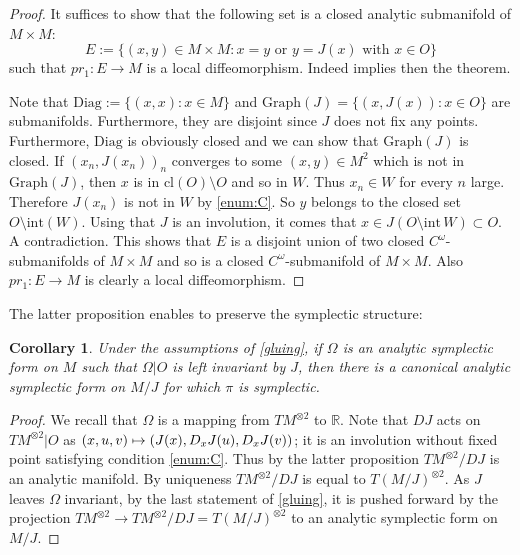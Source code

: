 \documentclass[JEP,XML,SOM,Unicode,NoFloatCountersInSection,Unicode,published]{cedram}
\newcommand\mto{\mathchoice{\longmapsto}{\mapsto}{\mapsto}{\mapsto}}
\newcommand{\cl}{\mathrm{cl}}
\newcommand{\Int}{\mathrm{int}}
\newcommand\R{\mathbb R}
\newtheorem{coro}[proposition]{Corollary}
\theoremstyle{definition}
\begin{document}
\begin{proof} It suffices to show that the following set is a closed analytic submanifold of $M\times M$:
\[E:=\{(x,y)\in M\times M: x=y\text{ or } y=J(x)\text{ with } x\in O\}\]
such that $pr_1: E\to M$ is a local diffeomorphism. Indeed \cite[.5]{Bo67} implies then the theorem.

Note that $\mathrm{Diag}:=\{(x,x): x\in M\}$ and $\mathrm{Graph}(J)=\{(x,J(x)): x\in O\}$ are submanifolds. Furthermore, they are disjoint since $J$ does not fix any points. Furthermore, $\mathrm{Diag}$ is obviously closed and we can show that
$\mathrm{Graph}(J)$ is closed. If $(x_n,J(x_n))_n$ converges to some $(x,y)\in M^2$ which is not in $\mathrm{Graph}(J)$, then $x$ is in $\cl(O)\setminus O$ and so in $W$. Thus $x_n\in W$ for every $n$ large. Therefore $J(x_n)$ is not in $W$ by \eqref{enum:C}. So $y$ belongs to the closed set
$O\setminus \Int(W)$. Using that $J$ is an involution, it comes that $x\in J(O\setminus \text{int}\, W)\subset O$. A contradiction. This shows that $E$ is a disjoint union of two closed $C^\omega$-submanifolds of $M\times M$ and so is a closed $C^\omega$-submanifold of $M\times M$. Also $pr_1: E\to M$ is clearly a local diffeomorphism.
\end{proof}

The latter proposition enables to preserve the symplectic structure:
\begin{coro}\label{gluing_coro}
Under the assumptions of \cref{gluing}, if $\Omega$ is an analytic symplectic form on $M$ such that $\Omega|O $ is left invariant by $J$, then there is a canonical analytic symplectic form on $M/J$ for which $\pi$ is symplectic.
\end{coro}
\begin{proof}
We recall that $\Omega$ is a mapping from $TM^{\otimes 2}$ to $\R$. Note that $DJ$ acts on $TM^{\otimes 2}|O$ as $(x,u,v)\mto (J(x), D_xJ(u), D_xJ(v))$; it is an involution without fixed point satisfying condition \eqref{enum:C}. Thus by the latter proposition $TM^{\otimes 2}/DJ$ is an analytic manifold. By uniqueness
$TM^{\otimes 2}/DJ$ is equal to $T(M/J)^{\otimes 2}$. As $J$ leaves $\Omega$ invariant,
by the last statement of \cref{gluing},
it is pushed forward by the projection
$TM^{\otimes 2}\to TM^{\otimes 2}/DJ= T(M/J)^{\otimes 2}$ to an analytic symplectic form on $M/J$.
\end{proof}
\end{document}
